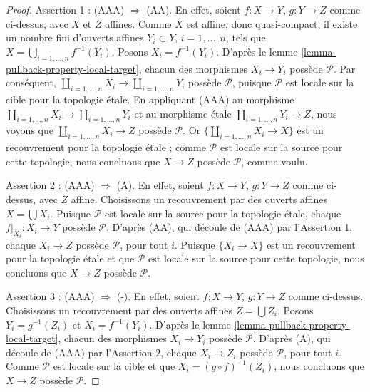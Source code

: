\begin{proof}
\medskip\noindent
Assertion 1 : (AAA) $\Rightarrow$ (AA).
En effet, soient $f : X \to Y$, $g : Y \to Z$ comme ci-dessus, avec $X$ et
$Z$ affines. Comme $X$ est affine, donc quasi-compact, il existe un nombre fini
d'ouverts affines $Y_i \subset Y$, $i = 1, \ldots, n$, tels que
$X = \bigcup_{i = 1, \ldots, n} f^{-1}(Y_i)$. Posons
$X_i = f^{-1}(Y_i)$. D'après le
lemme \ref{lemma-pullback-property-local-target}, chacun des morphismes
$X_i \to Y_i$ possède $\mathcal{P}$. Par conséquent,
$\coprod_{i = 1, \ldots, n} X_i \to \coprod_{i = 1, \ldots, n} Y_i$ possède
$\mathcal{P}$, puisque $\mathcal{P}$ est locale sur la cible pour la topologie
\'etale. En appliquant (AAA) au morphisme
$\coprod_{i = 1, \ldots, n} X_i \to \coprod_{i = 1, \ldots, n} Y_i$ et au
morphisme \'etale $\coprod_{i = 1, \ldots, n} Y_i \to Z$, nous voyons que
$\coprod_{i = 1, \ldots, n} X_i \to Z$ possède $\mathcal{P}$. Or
$\{\coprod_{i = 1, \ldots, n} X_i \to X\}$ est un recouvrement pour la
topologie \'etale ; comme $\mathcal{P}$ est locale sur la source pour cette
topologie, nous concluons que $X \to Z$ possède $\mathcal{P}$, comme voulu.

\medskip\noindent
Assertion 2 : (AAA) $\Rightarrow$ (A).
En effet, soient $f : X \to Y$, $g : Y \to Z$ comme ci-dessus, avec $Z$
affine. Choisissons un recouvrement par des ouverts affines
$X = \bigcup X_i$. Puisque $\mathcal{P}$ est locale sur la source pour la
topologie \'etale, chaque $f|_{X_i} : X_i \to Y$ possède $\mathcal{P}$. D'après
(AA), qui découle de (AAA) par l'Assertion 1, chaque $X_i \to Z$ possède
$\mathcal{P}$, pour tout $i$. Puisque $\{X_i \to X\}$ est un recouvrement
pour la topologie \'etale et que
$\mathcal{P}$ est locale sur la source pour cette topologie, nous
concluons que $X \to Z$ possède $\mathcal{P}$.

\medskip\noindent
Assertion 3 : (AAA) $\Rightarrow$ (-).
En effet, soient $f : X \to Y$, $g : Y \to Z$ comme ci-dessus. Choisissons un
recouvrement par des ouverts affines $Z = \bigcup Z_i$. Posons
$Y_i = g^{-1}(Z_i)$ et $X_i = f^{-1}(Y_i)$. D'après le
lemme \ref{lemma-pullback-property-local-target}, chacun des morphismes
$X_i \to Y_i$ possède $\mathcal{P}$. D'après (A), qui découle de (AAA) par
l'Assertion 2, chaque $X_i \to Z_i$ possède $\mathcal{P}$, pour tout $i$.
Comme $\mathcal{P}$ est locale sur la cible et que
$X_i = (g \circ f)^{-1}(Z_i)$, nous concluons que
$X \to Z$ possède $\mathcal{P}$.


\end{proof}
